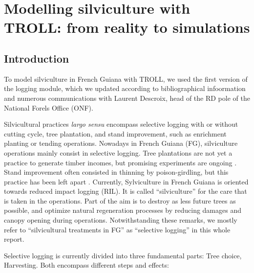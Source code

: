 \documentclass[12pt,]{article}
\let\oldsection\section
\renewcommand\section{\newpage\oldsection}
\theoremstyle{definition}
\theoremstyle{definition}
\theoremstyle{definition}
\theoremstyle{remark}
\begin{document}
\section{Modelling silviculture with TROLL: from reality to
simulations}\label{modelling-silviculture-with-troll-from-reality-to-simulations}

\subsection{Introduction}\label{introduction-2}

To model silviculture in French Guiana with TROLL, we used the first
version of the logging module, which we updated according to
bibliographical infoormation \citep[mostly in][]{Guitet2011} and
numerous communications with Laurent Descroix, head of the RD pole of
the National Forels Office (ONF).

Silvicultural practices \emph{largo sensu} encompass selective logging
with or without cutting cycle, tree plantation, and stand improvement,
such as enrichment planting or tending operations. Nowadays in French
Guiana (FG), silviculture operations mainly consist in selective
logging. Tree plantations are not yet a practice to generate timber
incomes, but promising experiments are ongoing \citep[Project
ForesTreeCulture;][]{Nicolini2016}. Stand improvement often consisted in
thinning by poison-girdling, but this practice has been left apart
\citep{Guitet2011}. Currently, Sylviculture in French Guiana is oriented
towards reduced impact logging (RIL). It is called ``silviculture'' for
the care that is taken in the operations. Part of the aim is to destroy
as less future trees as possible, and optimize natural regeneration
processes by reducing damages and canopy opening during operations.
Notwithstanding these remarks, we mostly refer to ``silvicultural
treatments in FG'' as ``selective logging'' in this whole report.

Selective logging is currently divided into three fundamental parts:
Tree choice, Harvesting. Both encompass different steps and effects:
\end{document}
